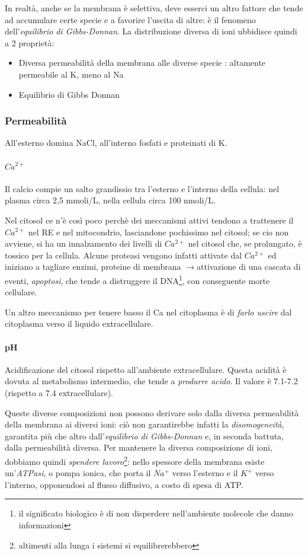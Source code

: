 \documentclass[a4paper,12pt]{article}
\newcommand{\lfreccia}{\ensuremath{\longrightarrow}}
\begin{document}
In realtà, anche se la membrana è selettiva, deve esserci un altro fattore che tende ad accumulare certe specie e a favorire l'uscita di altre: è il fenomeno dell'\emph{equilibrio di Gibbs-Donnan}. La distribuzione diversa di ioni ubbidisce quindi a 2 proprietà:
\begin{itemize}
\item{Diversa permeabilità della membrana alle diverse specie : altamente permeabile al K, meno al Na}
\item{Equilibrio di Gibbs Donnan}
\end{itemize}

\subsubsection{Permeabilità}
All'esterno domina NaCl, all'interno fosfati e proteinati di K.

\paragraph{$Ca^{2+}$}
Il calcio compie un salto grandissio tra l'esterno e l'interno della cellula: nel plasma circa 2,5 mmoli/L, nella cellula circa 100 nmoli/L.

Nel citosol ce n'è così poco perchè dei meccanismi attivi tendono a trattenere il $Ca^{2+}$ nel RE e nel mitocondrio, lasciandone pochissimo nel citosol; se cio non avviene, si ha un innalzamento dei livelli di $Ca^{2+}$ nel citosol che, se prolungato, è tossico per la cellula. Alcune proteasi vengono infatti attivate dal $Ca^{2+}$ ed iniziano a tagliare enzimi, proteine di membrana \lfreccia attivazione di una cascata di eventi, \emph{apoptosi}, che tende a distruggere il DNA\footnote{il significato biologico è di non disperdere nell'ambiente molecole che danno informazioni}, con conseguente morte cellulare.

Un altro meccanismo per tenere basso il Ca nel citoplasma è di \emph{farlo uscire} dal citoplasma verso il liquido extracellulare.

\paragraph{pH}

Acidificazione del citosol rispetto all'ambiente extracellulare. Questa acidità è dovuta al metabolismo intermedio, che tende a \emph{produrre acido}. Il valore è 7.1-7.2 (rispetto a 7.4 extracellulare).

Queste diverse composizioni non possono derivare solo dalla diversa permeabilità della membrana ai diversi ioni: ciò non garantirebbe infatti la \emph{disomogeneità}, garantita più che altro dall'\emph{equilibrio di Gibbs-Donnan} e, in seconda battuta, dalla permeabilità diversa. Per mantenere la diversa composizione di ioni, dobbiamo quindi \emph{spendere lavoro}\footnote{altimenti alla lunga i sistemi si equilibrerebbero}: nello spessore della membrana esiste un'\emph{ATPasi}, o pompa ionica, che porta il $Na^{+}$ verso l'esterno e il $K^{+}$ verso l'interno, opponendosi al flusso diffusivo, a costo di spesa di ATP.
\end{document}
